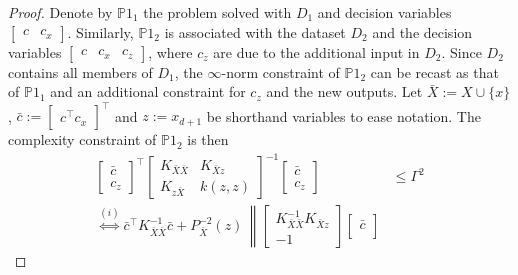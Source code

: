 \begin{proof}
	Denote by $\mathds{P}1_1$ the problem solved with $D_1$ and decision variables $\begin{bmatrix} c & c_x \end{bmatrix}$. Similarly, $\mathds{P}1_2$ is associated with the dataset $D_2$ and the decision variables $\begin{bmatrix} c & c_x & c_z \end{bmatrix}$, where $c_z$ are due to the additional input in $D_2$. Since $D_2$ contains all members of $D_1$, the $\infty$-norm constraint of $\mathds{P}1_2$ can be recast as that of $\mathds{P}1_1$ and an additional constraint for $c_z$ and the new outputs. Let $\bar X := X \cup \{x\}$, $\bar c := \begin{bmatrix} c^\top c_x \end{bmatrix}^\top$ and $z := x_{d+1}$ be shorthand variables to ease notation. The complexity constraint of $\mathds{P}1_2$ is then
	\begin{subequations}
		\begin{align}
            \begin{bmatrix}
				\bar c \\
				c_z
			\end{bmatrix}^\top 
			\begin{bmatrix}
				K_{\bar X \bar X} & K_{\bar X z} \\
				K_{z \bar X} & k(z,z)
			\end{bmatrix}^{-1} 
			\begin{bmatrix}
				\bar c \\
				c_z
			\end{bmatrix} & \leq \Gamma^2 \\
			\overset{(i)}{\Leftrightarrow}
			\bar c^\top K_{\bar X \bar X}^{-1} \bar c +
			P_{\bar X}^{-2}(z) \, 
			\left\|
			\begin{bmatrix}
				K_{\bar X \bar X}^{-1} K_{\bar X z} \\
				-1
			\end{bmatrix}
			\begin{bmatrix}
				\bar c \\

\end{bmatrix}
\end{align}
\end{subequations}
\end{proof}
